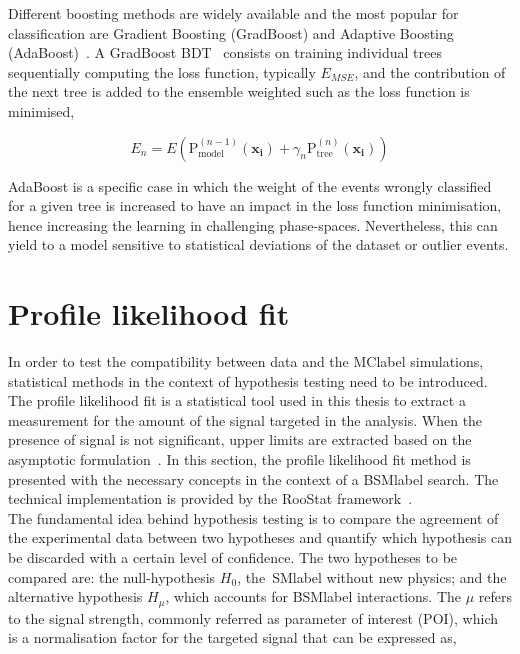 Different boosting methods are widely available and the most popular for classification are Gradient Boosting (GradBoost) and Adaptive Boosting (AdaBoost)~\cite{FREUND1997119}. A GradBoost BDT~\cite{Chen_2016} consists on training individual trees sequentially computing the loss function, typically $E_{MSE}$, and the contribution of the next tree is added to the ensemble weighted such as the loss function is minimised,

\begin{equation}
    E_n = E\left(\text{P}_{\text{model}}^(n-1)(\mathbf{x_i})+\gamma_n \text{P}_{\text{tree}}^{(n)}(\mathbf{x_i})\right)
\end{equation}

AdaBoost is a specific case in which the weight of the events wrongly classified for a given tree is increased to have an impact in the loss function minimisation, hence increasing the learning in challenging phase-spaces. Nevertheless, this can yield to a model sensitive to statistical deviations of the dataset or outlier events.


\section{Profile likelihood fit}
\label{sec:profilelikelihoodfit}

In order to test the compatibility between data and the \acrshort{MClabel} simulations, statistical methods in the context of hypothesis testing need to be introduced. The profile likelihood fit is a statistical tool used in this thesis to extract a measurement for the amount of the signal targeted in the analysis. When the presence of signal is not significant, upper limits are extracted based on the asymptotic formulation~\cite{Cowan_2011}. In this section, the profile likelihood fit method is presented with the necessary concepts in the context of a \acrshort{BSMlabel} search.
The technical implementation is provided by the RooStat framework~\cite{10.48550/arxiv.1009.1003}.\\

The fundamental idea behind hypothesis testing is to compare the agreement of the experimental data between two hypotheses and quantify which hypothesis can be discarded with a certain level of confidence. The two hypotheses to be compared are: the null-hypothesis $H_0$, the~\acrshort{SMlabel} without new physics; and the alternative hypothesis $H_\mu$, which accounts for \acrshort{BSMlabel} interactions. The $\mu$ refers to the signal strength, commonly referred as parameter of interest (POI), which is a normalisation factor for the targeted signal that can be expressed as,


